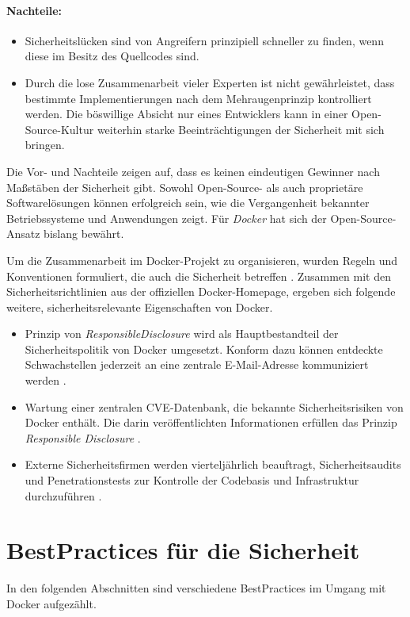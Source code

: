 \documentclass[../main.tex]{subfiles}
\begin{document}
    \paragraph{Nachteile:}
    \begin{itemize}
      \item Sicherheitslücken sind von Angreifern prinzipiell schneller zu finden, wenn diese im Besitz des Quellcodes sind.
      \item Durch die lose Zusammenarbeit vieler Experten ist nicht gewährleistet, dass bestimmte Implementierungen nach dem Mehraugenprinzip kontrolliert werden. Die böswillige Absicht nur eines Entwicklers kann in einer Open-Source-Kultur weiterhin starke Beeinträchtigungen der Sicherheit mit sich bringen.
    \end{itemize}

    Die Vor- und Nachteile zeigen auf, dass es keinen eindeutigen Gewinner nach Maßstäben der Sicherheit gibt. Sowohl Open-Source- als auch proprietäre Softwarelösungen können erfolgreich sein, wie die Vergangenheit bekannter Betriebssysteme und Anwendungen zeigt. Für \emph{Docker} hat sich der Open-Source-Ansatz bislang bewährt.

    Um die Zusammenarbeit im Docker-Projekt zu organisieren, wurden Regeln und Konventionen formuliert, die auch die Sicherheit betreffen \cite{githubDockerContribution}. Zusammen mit den Sicherheitsrichtlinien aus der offiziellen Docker-Homepage, ergeben sich folgende weitere, sicherheitsrelevante Eigenschaften von Docker.

    \begin{itemize}
      \item Prinzip von \emph{\acrshort{ResponsibleDisclosure}} wird als Hauptbestandteil der Sicherheitspolitik von Docker umgesetzt. Konform dazu können entdeckte Schwachstellen jederzeit an eine zentrale E-Mail-Adresse kommuniziert werden \cite{dockerSecurityPortal}.
      \item Wartung einer zentralen \acrshort{CVE}-Datenbank, die bekannte Sicherheitsrisiken von Docker enthält. Die darin veröffentlichten Informationen erfüllen das Prinzip \emph{Responsible Disclosure} \cite{dockerCVEList}.
      \item Externe Sicherheitsfirmen werden vierteljährlich beauftragt, Sicherheitsaudits und Penetrationstests zur Kontrolle der Codebasis und Infrastruktur durchzuführen \cite[S.5]{dockerSecIntro}.
    \end{itemize}

  \section{\glspl{BestPractice} für die Sicherheit}
    In den folgenden Abschnitten sind verschiedene \glspl{BestPractice} im Umgang mit Docker aufgezählt.
\end{document}
